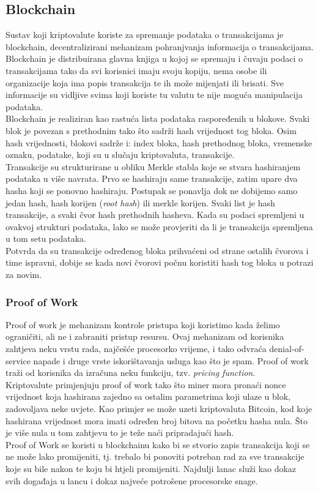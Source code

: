 \documentclass[12pt]{article}
\begin{document}
\subsection{Blockchain}
Sustav koji kriptovalute koriste za spremanje podataka o transakcijama je blockchain, decentralizirani mehanizam pohranjvanja informacija o transakcijama. Blockchain je distribuirana glavna knjiga u kojoj se spremaju i čuvaju podaci o transakcijama tako da svi korisnici imaju svoju kopiju, nema osobe ili organizacije koja ima popis transakcija te ih može mijenjati ili brisati. Sve informacije su vidljive svima koji koriste tu valutu te nije moguća manipulacija podataka. \\
Blockchain je realiziran kao rastuća lista podataka raspoređenih u blokove. Svaki blok je povezan s prethodnim tako što sadrži hash vrijednost tog bloka. Osim hash vrijednosti, blokovi sadrže i: index bloka, hash prethodnog bloka, vremenske oznaku, podatake, koji su u slučaju
kriptovaluta, transakcije. \\
Transakcije su strukturirane u obliku Merkle stabla koje se stvara hashiranjem podataka u više navrata. Prvo se hashiraju same transakcije, zatim upare dva hasha koji se ponovno hashiraju.
Postupak se ponavlja dok ne dobijemo samo jedan hash, hash korijen (\textit{root hash}) ili  merkle korijen. Svaki list je hash transakcije, a svaki čvor hash prethodnih hasheva. Kada su podaci spremljeni u ovakvoj strukturi podataka, lako se može provjeriti da li je transakcija spremljena u tom setu podataka. \\
Potvrda da su transakcije određenog bloka prihvaćeni od strane ostalih čvorova i time ispravni, dobije se kada novi čvorovi počnu koristiti hash tog bloka u potrazi za novim.


\subsubsection{Proof of Work}
Proof of work je mehanizam kontrole pristupa koji koristimo kada želimo ograničiti, ali ne i zabraniti pristup resursu. Ovaj mehanizam od korisnika zahtjeva neku vrstu rada, najčešće procesorko vrijeme, i tako odvraća denial-of-service napade i druge vrste iskorištavanja usluga kao što je spam. Proof of work traži od korisnika da izračuna neku funkciju, tzv. \textit{pricing function}.\\
Kriptovalute primjenjuju proof of work tako što miner mora pronaći nonce vrijednost koja hashirana zajedno sa ostalim parametrima koji ulaze u blok, zadovoljava neke uvjete. Kao primjer se može uzeti kriptovaluta Bitcoin, kod koje hashirana vrijednost mora imati određen broj bitova na početku hasha nula. Što je više nula u tom zahtjevu to je teže naći pripradajući hash. \\
Proof of Work se koristi u blockchainu kako bi se stvorio zapis transakcija koji se ne može lako promijeniti, tj. trebalo bi ponoviti potreban rad za sve transakcije koje su bile nakon te koju bi htjeli promijeniti. Najdulji lanac služi kao dokaz svih događaja u lancu i dokaz najveće potrošene procesorske snage.\cite{proof-of-work}
\end{document}
